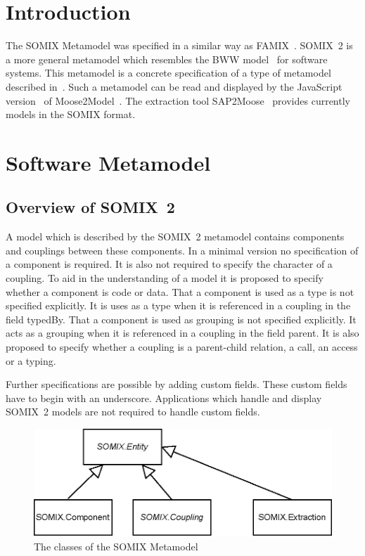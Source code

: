 \documentclass[preprint,12pt]{elsarticle}
\begin{document}

\section{Introduction}
\label{intro}
The SOMIX Metamodel was specified in a similar way as FAMIX~\cite{r_Ducasse_2011}. 
SOMIX~2 is a more general metamodel which resembles the BWW model~\cite{r_WandWeber_1990,BungeVol4_1979} for software systems. 
This metamodel is a concrete specification of a type of metamodel described in~\cite{r_Metamodel_Preprint_2}.
Such a metamodel can be read and displayed by the JavaScript version~\cite{r_Moose2Model2} of Moose2Model~\cite{r_Moose2Model}. The extraction tool SAP2Moose~\cite{r_SAP2Moose} provides currently models in the SOMIX format.

\section{Software Metamodel}
\subsection{Overview of SOMIX~2}
A model which is described by the SOMIX~2 metamodel contains components and couplings between these components.
In a minimal version no specification of a component is required. 
It is also not required to specify the character of a coupling.
To aid in the understanding of a model it is proposed to specify whether a component is code or data. 
That a component is used as a type is not specified explicitly. It is uses as a type when it is referenced in a coupling in the field  typedBy.
That a component is used as grouping is not specified explicitly. It acts as a grouping when it is referenced in a coupling in the field parent.
It is also proposed to specify whether a coupling is a parent-child relation, a call, an access or a typing.

Further specifications are possible by adding custom fields. These custom fields have to begin with an underscore.
Applications which handle and display SOMIX~2 models are not required to handle custom fields.

\begin{figure} [h!] 
\centering

\includegraphics[width=1\columnwidth]{SOMIX_Classes.inkscape.eps} 
\caption{
The classes of the SOMIX Metamodel
}
\label{fig:InterfaceExample}   
\end{figure}
\end{document}
